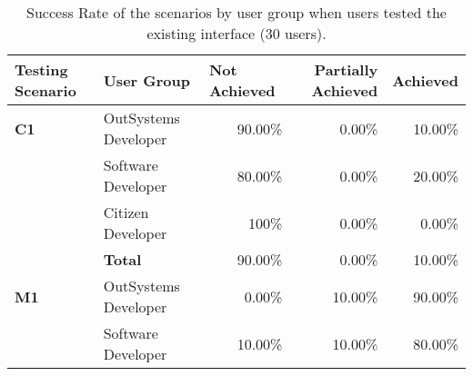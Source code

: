 \begin{table}[tb]
    \caption{Success Rate of the scenarios by user group when users tested the existing interface (30 users).}
    \label{tab:effectiveness_existing_interface}
    \begin{tabular}{@{}llrrr@{}}
    \toprule
    \rowcolor[HTML]{EFEFEF} 
    \textbf{Testing Scenario} & \textbf{User Group}  & \multicolumn{1}{l}{\cellcolor[HTML]{EFEFEF}\textbf{Not Achieved}} & \multicolumn{1}{C{2cm}}{\cellcolor[HTML]{EFEFEF}\textbf{Partially Achieved}} & \multicolumn{1}{l}{\cellcolor[HTML]{EFEFEF}\textbf{Achieved}} \\ \midrule
    \textbf{C1}               & OutSystems Developer & 90.00\%                                                           & 0.00\%                                                                  & 10.00\%                                                        \\
                              & Software Developer   & 80.00\%                                                           & 0.00\%                                                                  & 20.00\%                                                       \\
                              & Citizen Developer    & 100\%                                                             & 0.00\%                                                                  & 0.00\%                                                        \\
                              & \textbf{Total}       & 90.00\%                                                           & 0.00\%                                                                  & 10.00\%                                                        \\ \midrule
    \textbf{M1}               & OutSystems Developer & 0.00\%                                                            & 10.00\%                                                                 & 90.00\%                                                       \\
                              & Software Developer   & 10.00\%                                                           & 10.00\%                                                                 & 80.00\%                                                       \\

\end{tabular}
\end{table}
